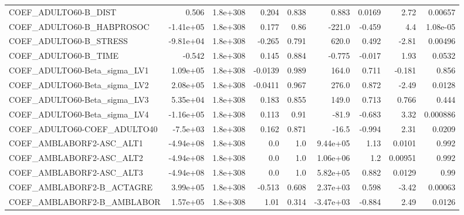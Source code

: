 \begin{tabular}{lrrrrrrrr}
COEF\_ADULTO60-B\_DIST              &       0.506 &     1.8e+308 &   0.204 &    0.838 &      0.883 &      0.0169 &         2.72 &       0.00657 \\
COEF\_ADULTO60-B\_HABPROSOC         &   -1.41e+05 &     1.8e+308 &   0.177 &     0.86 &     -221.0 &      -0.459 &          4.4 &      1.08e-05 \\
COEF\_ADULTO60-B\_STRESS            &   -9.81e+04 &     1.8e+308 &  -0.265 &    0.791 &      620.0 &       0.492 &        -2.81 &       0.00496 \\
COEF\_ADULTO60-B\_TIME              &      -0.542 &     1.8e+308 &   0.145 &    0.884 &     -0.775 &      -0.017 &         1.93 &        0.0532 \\
COEF\_ADULTO60-Beta\_sigma\_LV1      &    1.09e+05 &     1.8e+308 & -0.0139 &    0.989 &      164.0 &       0.711 &       -0.181 &         0.856 \\
COEF\_ADULTO60-Beta\_sigma\_LV2      &    2.08e+05 &     1.8e+308 & -0.0411 &    0.967 &      276.0 &       0.872 &        -2.49 &        0.0128 \\
COEF\_ADULTO60-Beta\_sigma\_LV3      &    5.35e+04 &     1.8e+308 &   0.183 &    0.855 &      149.0 &       0.713 &        0.766 &         0.444 \\
COEF\_ADULTO60-Beta\_sigma\_LV4      &   -1.16e+05 &     1.8e+308 &   0.113 &     0.91 &      -81.9 &      -0.683 &         3.32 &      0.000886 \\
COEF\_ADULTO60-COEF\_ADULTO40       &    -7.5e+03 &     1.8e+308 &   0.162 &    0.871 &      -16.5 &      -0.994 &         2.31 &        0.0209 \\
COEF\_AMBLABORF2-ASC\_ALT1          &   -4.94e+08 &     1.8e+308 &     0.0 &      1.0 &   9.44e+05 &        1.13 &       0.0101 &         0.992 \\
COEF\_AMBLABORF2-ASC\_ALT2          &   -4.94e+08 &     1.8e+308 &     0.0 &      1.0 &   1.06e+06 &         1.2 &      0.00951 &         0.992 \\
COEF\_AMBLABORF2-ASC\_ALT3          &   -4.94e+08 &     1.8e+308 &     0.0 &      1.0 &   5.82e+05 &       0.882 &       0.0129 &          0.99 \\
COEF\_AMBLABORF2-B\_ACTAGRE         &    3.99e+05 &     1.8e+308 &  -0.513 &    0.608 &   2.37e+03 &       0.598 &        -3.42 &       0.00063 \\
COEF\_AMBLABORF2-B\_AMBLABOR        &    1.57e+05 &     1.8e+308 &    1.01 &    0.314 &  -3.47e+03 &      -0.884 &         2.49 &        0.0126 \\

\end{tabular}
